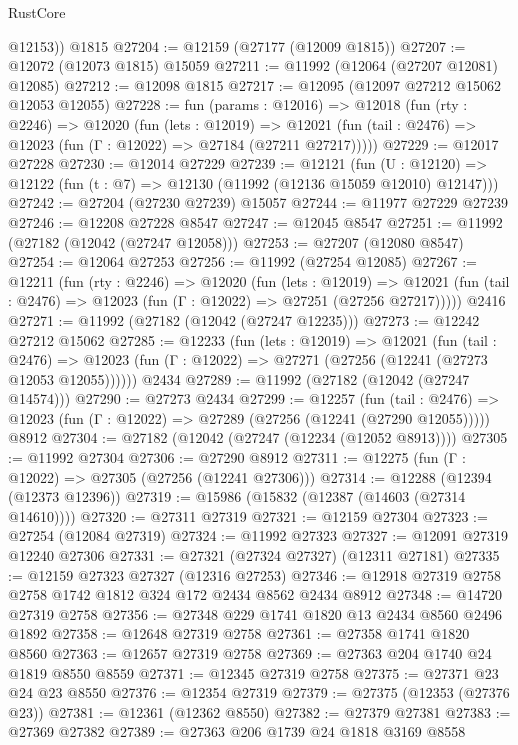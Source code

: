 \begin{lexlean}{RustCore}
\begin{coremodule}
        @12153))
    @1815
@27204 := @12159 (@27177 (@12009 @1815))
@27207 := @12072 (@12073 @1815) @15059
@27211 := @11992 (@12064 (@27207 @12081) @12085)
@27212 := @12098 @1815
@27217 := @12095 (@12097 @27212 @15062 @12053 @12055)
@27228 := fun (params : @12016) =>
  @12018
    (fun (rty : @2246) =>
    @12020
      (fun (lets : @12019) =>
      @12021 (fun (tail : @2476) => @12023 (fun (Γ : @12022) => @27184 (@27211 @27217)))))
@27229 := @12017 @27228
@27230 := @12014 @27229
@27239 := @12121
    (fun (U : @12120) => @12122 (fun (t : @7) => @12130 (@11992 (@12136 @15059 @12010) @12147)))
@27242 := @27204 (@27230 @27239) @15057
@27244 := @11977 @27229 @27239
@27246 := @12208 @27228 @8547
@27247 := @12045 @8547
@27251 := @11992 (@27182 (@12042 (@27247 @12058)))
@27253 := @27207 (@12080 @8547)
@27254 := @12064 @27253
@27256 := @11992 (@27254 @12085)
@27267 := @12211
    (fun (rty : @2246) =>
    @12020
      (fun (lets : @12019) =>
      @12021 (fun (tail : @2476) => @12023 (fun (Γ : @12022) => @27251 (@27256 @27217)))))
    @2416
@27271 := @11992 (@27182 (@12042 (@27247 @12235)))
@27273 := @12242 @27212 @15062
@27285 := @12233
    (fun (lets : @12019) =>
    @12021
      (fun (tail : @2476) =>
      @12023 (fun (Γ : @12022) => @27271 (@27256 (@12241 (@27273 @12053 @12055))))))
    @2434
@27289 := @11992 (@27182 (@12042 (@27247 @14574)))
@27290 := @27273 @2434
@27299 := @12257
    (fun (tail : @2476) => @12023 (fun (Γ : @12022) => @27289 (@27256 (@12241 (@27290 @12055)))))
    @8912
@27304 := @27182 (@12042 (@27247 (@12234 (@12052 @8913))))
@27305 := @11992 @27304
@27306 := @27290 @8912
@27311 := @12275 (fun (Γ : @12022) => @27305 (@27256 (@12241 @27306)))
@27314 := @12288 (@12394 (@12373 @12396))
@27319 := @15986 (@15832 (@12387 (@14603 (@27314 @14610))))
@27320 := @27311 @27319
@27321 := @12159 @27304
@27323 := @27254 (@12084 @27319)
@27324 := @11992 @27323
@27327 := @12091 @27319 @12240 @27306
@27331 := @27321 (@27324 @27327) (@12311 @27181)
@27335 := @12159 @27323 @27327 (@12316 @27253)
@27346 := @12918 @27319 @2758 @2758 @1742 @1812 @324 @172 @2434 @8562 @2434 @8912
@27348 := @14720 @27319 @2758
@27356 := @27348 @229 @1741 @1820 @13 @2434 @8560 @2496 @1892
@27358 := @12648 @27319 @2758
@27361 := @27358 @1741 @1820 @8560
@27363 := @12657 @27319 @2758
@27369 := @27363 @204 @1740 @24 @1819 @8550 @8559
@27371 := @12345 @27319 @2758
@27375 := @27371 @23 @24 @23 @8550
@27376 := @12354 @27319
@27379 := @27375 (@12353 (@27376 @23))
@27381 := @12361 (@12362 @8550)
@27382 := @27379 @27381
@27383 := @27369 @27382
@27389 := @27363 @206 @1739 @24 @1818 @3169 @8558

\end{coremodule}
\end{lexlean}
